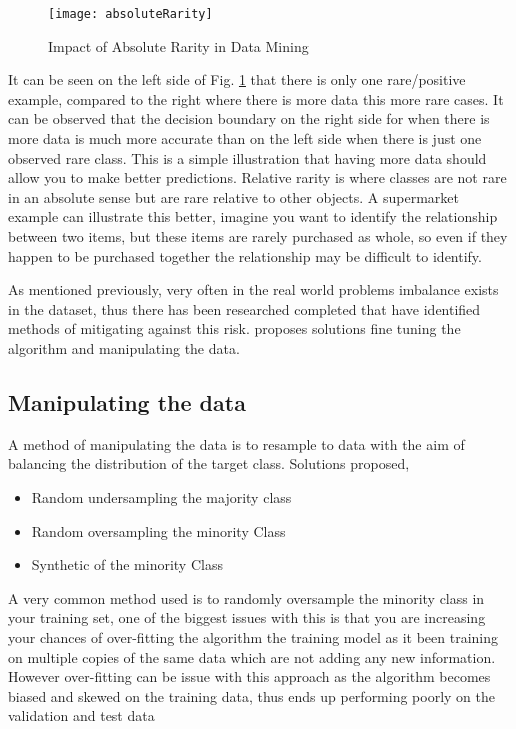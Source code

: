 \begin{figure}[H]
	\texttt{[image: absoluteRarity]}
	\caption{
				Impact of Absolute Rarity in Data Mining \\ \cite[Source:][]{weiss_mining_2004}
			}
	\label{fig:absoluteRarity}
\end{figure}

It can be seen on the left side of Fig. \ref{fig:absoluteRarity} that there is only one rare/positive example, compared to the right where there is more data this more rare cases. It can be observed that the decision boundary on the right side for when there is more data is much more accurate than on the left side when there is just one observed rare class. This is a simple illustration that having more data should allow you to make better predictions. Relative rarity is where classes are not rare in an absolute sense but are rare relative to other objects. A supermarket example can illustrate this better, imagine you want to identify the relationship between two items, but these items are rarely purchased as whole, so even if they happen to be purchased together the relationship may be difficult to identify.

As mentioned previously, very often in the real world problems imbalance exists in the dataset, thus there has been researched completed that have identified methods of mitigating against this risk. \citep{chawla_editorial:_2004} proposes solutions fine tuning the algorithm and manipulating the data. 

\subsection{Manipulating the data}

A method of manipulating the data is to resample to data with the aim of balancing the distribution of the target class. Solutions proposed,

\begin{itemize}
	\item Random undersampling the majority class
	\item Random oversampling the minority Class
	\item Synthetic of the minority Class 
\end{itemize}

A very common method used is to randomly oversample the minority class in your training set, one of the biggest issues with this is that you are increasing your chances of over-fitting the algorithm the training model as it been training on multiple copies of the same data which are not adding any new information. However over-fitting can be issue with this approach as the algorithm becomes biased and skewed on the training data, thus ends up performing poorly on the validation and test data \cite[see][]{hawkins_problem_2004}

